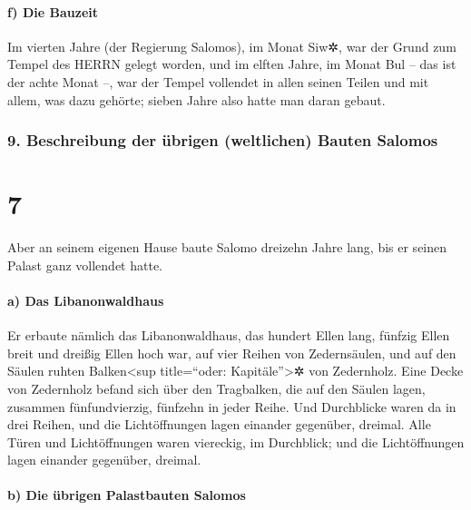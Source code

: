 \hypertarget{f-die-bauzeit}{%
\paragraph{f) Die Bauzeit}\label{f-die-bauzeit}}

Im vierten Jahre (der Regierung Salomos), im Monat Siw✲,
war der Grund zum Tempel des HERRN gelegt worden, und im
elften Jahre, im Monat Bul -- das ist der achte Monat --, war der Tempel
vollendet in allen seinen Teilen und mit allem, was dazu gehörte; sieben
Jahre also hatte man daran gebaut.

\hypertarget{beschreibung-der-uxfcbrigen-weltlichen-bauten-salomos}{%
\subsubsection{9. Beschreibung der übrigen (weltlichen) Bauten
Salomos}\label{beschreibung-der-uxfcbrigen-weltlichen-bauten-salomos}}

\hypertarget{section-6}{%
\section{7}\label{section-6}}

Aber an seinem eigenen Hause baute Salomo dreizehn Jahre
lang, bis er seinen Palast ganz vollendet hatte.

\hypertarget{a-das-libanonwaldhaus}{%
\paragraph{a) Das Libanonwaldhaus}\label{a-das-libanonwaldhaus}}

Er erbaute nämlich das Libanonwaldhaus, das hundert Ellen
lang, fünfzig Ellen breit und dreißig Ellen hoch war, auf vier Reihen
von Zedernsäulen, und auf den Säulen ruhten Balken\textless sup
title=``oder: Kapitäle''\textgreater✲ von Zedernholz. Eine
Decke von Zedernholz befand sich über den Tragbalken, die auf den Säulen
lagen, zusammen fünfundvierzig, fünfzehn in jeder Reihe.
Und Durchblicke waren da in drei Reihen, und die
Lichtöffnungen lagen einander gegenüber, dreimal. Alle
Türen und Lichtöffnungen waren viereckig, im Durchblick; und die
Lichtöffnungen lagen einander gegenüber, dreimal.

\hypertarget{b-die-uxfcbrigen-palastbauten-salomos}{%
\paragraph{b) Die übrigen Palastbauten
Salomos}\label{b-die-uxfcbrigen-palastbauten-salomos}}

